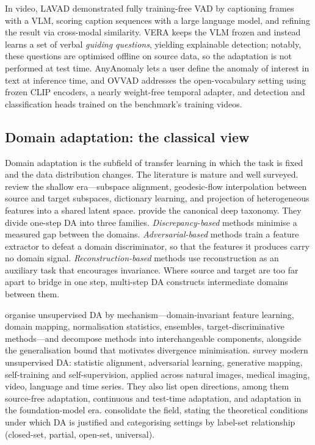 \documentclass[a4paper,fleqn]{cas-sc}
\begin{document}
In video, LAVAD \citep{zanella2024lavad} demonstrated fully training-free VAD by
captioning frames with a VLM, scoring caption sequences with a large language
model, and refining the result via cross-modal similarity. VERA
\citep{ye2025vera} keeps the VLM frozen and instead learns a set of verbal
\emph{guiding questions}, yielding explainable detection; notably, these
questions are optimised offline on source data, so the adaptation is not
performed at test time. AnyAnomaly \citep{anyanomaly2025} lets a user define the
anomaly of interest in text at inference time, and OVVAD \citep{wu2024ovvad}
addresses the open-vocabulary setting using frozen CLIP encoders, a nearly
weight-free temporal adapter, and detection and classification heads trained
on the benchmark's training videos.

\subsection{Domain adaptation: the classical view}
Domain adaptation is the subfield of transfer learning in which the task is
fixed and the data distribution changes. The literature is mature and well
surveyed. \citet{patel2015visual} review the shallow era---subspace alignment,
geodesic-flow interpolation between source and target subspaces, dictionary
learning, and projection of heterogeneous features into a shared latent space.
\citet{wang2018deep} provide the canonical deep taxonomy. They divide one-step
DA into three families. \emph{Discrepancy-based} methods minimise a measured
gap between the domains. \emph{Adversarial-based} methods train a feature
extractor to defeat a domain discriminator, so that the features it produces
carry no domain signal. \emph{Reconstruction-based} methods use reconstruction
as an auxiliary task that encourages invariance. Where source and target are too
far apart to bridge in one step, multi-step DA constructs intermediate domains
between them.

\citet{wilson2020survey} organise unsupervised DA by mechanism---domain-invariant
feature learning, domain mapping, normalisation statistics, ensembles,
target-discriminative methods---and decompose methods into interchangeable
components, alongside the generalisation bound that motivates divergence
minimisation. \citet{liu2022deep} survey modern unsupervised DA:
statistic alignment, adversarial learning, generative mapping, self-training and
self-supervision, applied across natural images, medical imaging, video,
language and time series. They also list open directions, among them
source-free adaptation, continuous and test-time adaptation, and adaptation in
the foundation-model era. \citet{singhal2023domain} consolidate the field,
stating the theoretical conditions under which DA is justified and categorising
settings by label-set relationship (closed-set, partial, open-set, universal).
\end{document}
